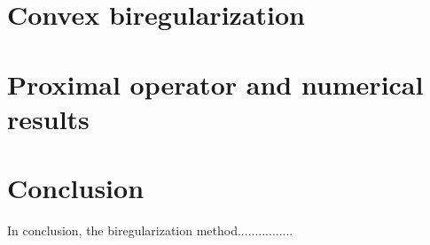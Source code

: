 \documentclass{article}
\begin{document}
\section{Convex biregularization}


\section{Proximal operator and numerical results}



\section*{Conclusion}

In conclusion, the biregularization method................



\nocite{*}
\printbibliography
\end{document}
